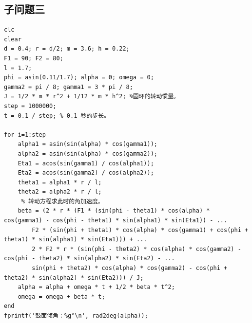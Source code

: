 \documentclass{cumcm}
\begin{document}
\subsection{子问题三}
\begin{lstlisting}
clc
clear
d = 0.4; r = d/2; m = 3.6; h = 0.22;
F1 = 90; F2 = 80;
l = 1.7;
phi = asin(0.11/1.7); alpha = 0; omega = 0;
gamma2 = pi / 8; gamma1 = 3 * pi / 8;
J = 1/2 * m * r^2 + 1/12 * m * h^2; %圆环的转动惯量。
step = 1000000;
t = 0.1 / step; % 0.1 秒的步长。

for i=1:step
    alpha1 = asin(sin(alpha) * cos(gamma1));
    alpha2 = asin(sin(alpha) * cos(gamma2));
    Eta1 = acos(sin(gamma1) / cos(alpha1));
    Eta2 = acos(sin(gamma2) / cos(alpha2));
    theta1 = alpha1 * r / l;
    theta2 = alpha2 * r / l;
     % 转动方程求此时的角加速度。
    beta = (2 * r * (F1 * (sin(phi - theta1) * cos(alpha) * cos(gamma1) - cos(phi - theta1) * sin(alpha1) * sin(Eta1)) - ...
        F2 * (sin(phi + theta1) * cos(alpha) * cos(gamma1) + cos(phi + theta1) * sin(alpha1) * sin(Eta1))) + ...
        2 * F2 * r * (sin(phi - theta2) * cos(alpha) * cos(gamma2) - cos(phi - theta2) * sin(alpha2) * sin(Eta2) - ...
        sin(phi + theta2) * cos(alpha) * cos(gamma2) - cos(phi + theta2) * sin(alpha2) * sin(Eta2))) / J;
    alpha = alpha + omega * t + 1/2 * beta * t^2;
    omega = omega + beta * t;
end
fprintf('鼓面倾角：%g°\n', rad2deg(alpha));
\end{lstlisting}
\end{document}
